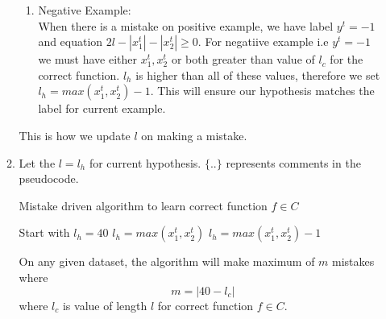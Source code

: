 \begin{enumerate}
\begin{enumerate}
\begin{enumerate}
			\item Negative Example: \\
			When there is a mistake on positive example, we have label $y^t = -1$ and equation $2l - |x_1^t| - |x_2^t| \geq 0$. For negatiive example i.e $y^t = -1$ we must have either $x_1^t, x_2^t$ or both greater than value of $l_c$ for the correct function. $l_h$ is higher than all of these values, therefore we set $l_h = max(x_1^t, x_2^t) - 1$. This will ensure our hypothesis matches the label for current example.
		\end{enumerate}
			This is how we update $l$ on making a mistake.
		\item 
		Let the $l = l_h$ for current hypothesis. $\{ .. \}$ represents comments in the pseudocode.\\
		\begin{algorithm}
			\caption{Mistake driven algorithm to learn correct function $f \in C$}
			\begin{algorithmic}
				\STATE Start with $l_h = 40$ 
							\STATE $l_h = max(x_1^t, x_2^t)$ 
						\ELSE
							\STATE $l_h = max(x_1^t, x_2^t) - 1$ 
						\ENDIF				
					\ENDIF 
				\ENDFOR
			\end{algorithmic}	
		\end{algorithm}
	
	On any given dataset, the algorithm will make maximum of $m$ mistakes where $$m = |40 - l_c|$$ where $l_c$ is value of length $l$ for correct function $f \in C$.
	
	\end{enumerate}	    
    
     	 
    
    


\end{enumerate}

